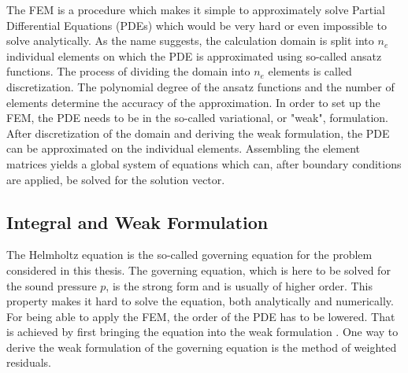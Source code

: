 \documentclass[%
  a4paper,oneside,%
  11pt,%
  smallchapters,
  style=printdev,
  extramargin,
  green,%
  rgb, <cmyk>
  ]{tubsbook}
\begin{document}
The FEM is a procedure which makes it simple to approximately solve Partial Differential Equations (PDEs) which would be very hard or even impossible to solve analytically. As the name suggests, the calculation domain is split into $n_e$ individual elements on which the PDE is approximated using so-called ansatz functions. The process of dividing the domain into $n_e$ elements is called discretization. The polynomial degree of the ansatz functions and the number of elements determine the accuracy of the approximation. In order to set up the FEM, the PDE needs to be in the so-called variational, or "weak", formulation. 
After discretization of the domain and deriving the weak formulation, the PDE can be approximated on the individual elements. Assembling the element matrices yields a global system of equations which can, after boundary conditions are applied, be solved for the solution vector.


\subsection{Integral and Weak Formulation}
The Helmholtz equation is the so-called governing equation for the problem considered in this thesis. The governing equation, which is here to be solved for the sound pressure $p$, is the strong form and is usually of higher order. This property makes it hard to solve the equation, both analytically and numerically. For being able to apply the FEM, the order of the PDE has to be lowered. That is achieved by first bringing the equation into the weak formulation \cite{Lanczos1986}. 
One way to derive the weak formulation of the governing equation is the method of weighted residuals. 
\end{document}
